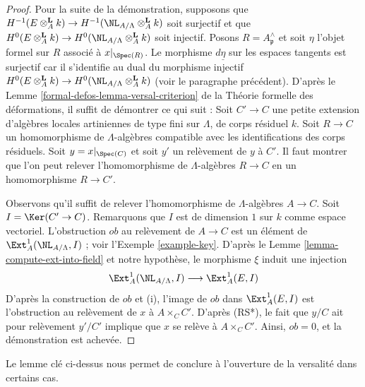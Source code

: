 \begin{proof}
\medskip\noindent
Pour la suite de la démonstration, supposons que $H^{-1}(E \otimes_A^\mathbf{L} k) \to
H^{-1}(\NL_{A/\Lambda} \otimes_A^\mathbf{L} k)$
soit surjectif et que
$H^0(E \otimes_A^\mathbf{L} k) \to
H^0(\NL_{A/\Lambda} \otimes_A^\mathbf{L} k)$
soit injectif. Posons $R = A_\mathfrak p^\wedge$ et soit $\eta$ l'objet
formel sur $R$ associé à $x|_{\Spec(R)}$.
Le morphisme $d\underline{\eta}$ sur les espaces tangents est surjectif
car il s'identifie au dual du morphisme injectif
$H^0(E \otimes_A^{\mathbf{L}} k) \to
H^0(\NL_{A/\Lambda} \otimes_A^{\mathbf{L}} k)$
(voir le paragraphe précédent). D'après le
Lemme \ref{formal-defos-lemma-versal-criterion} de la Théorie formelle des déformations,
il suffit de démontrer ce qui suit :
Soit $C' \to C$ une petite extension d'algèbres locales artiniennes
de type fini sur $\Lambda$, de corps résiduel $k$. Soit $R \to C$ un
homomorphisme de $\Lambda$-algèbres compatible avec les identifications des corps résiduels.
Soit $y = x|_{\Spec(C)}$ et soit $y'$ un relèvement de $y$ à $C'$.
Il faut montrer que l'on peut relever l'homomorphisme de $\Lambda$-algèbres $R \to C$ en un homomorphisme $R \to C'$.

\medskip\noindent
Observons qu'il suffit de relever l'homomorphisme de $\Lambda$-algèbres $A \to C$.
Soit $I = \Ker(C' \to C)$. Remarquons que $I$ est de dimension $1$ sur $k$ comme espace vectoriel.
L'obstruction $ob$ au relèvement de $A \to C$ est un élément de
$\Ext^1_A(\NL_{A/\Lambda}, I)$ ; voir l'Exemple \ref{example-key}.
D'après le Lemme \ref{lemma-compute-ext-into-field} et notre hypothèse, le morphisme
$\xi$ induit une injection
$$
\Ext^1_A(\NL_{A/\Lambda}, I)
\longrightarrow
\Ext^1_A(E, I)
$$
D'après la construction de $ob$ et (i), l'image de $ob$ dans $\Ext^1_A(E, I)$
est l'obstruction au relèvement de $x$ à $A \times_C C'$. D'après (RS*), le fait que
$y/C$ ait pour relèvement $y'/C'$ implique que $x$ se relève à $A \times_C C'$. Ainsi,
$ob = 0$, et la démonstration est achevée.
\end{proof}

\noindent
Le lemme clé ci-dessus nous permet de conclure à l'ouverture de la
versalité dans certains cas.

